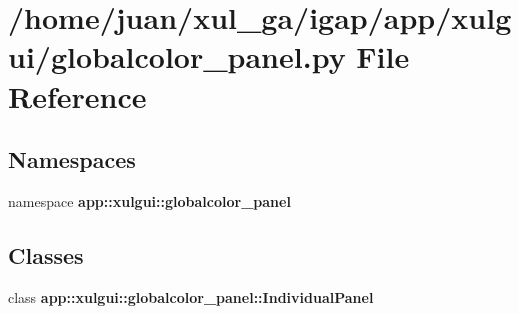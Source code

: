 \section{/home/juan/xul\_\-ga/igap/app/xulgui/globalcolor\_\-panel.py File Reference}
\label{globalcolor__panel_8py}
\subsection*{Namespaces}
\begin{CompactItemize}
\item 
namespace {\bf app::xulgui::globalcolor\_\-panel}
\end{CompactItemize}
\subsection*{Classes}
\begin{CompactItemize}
\item 
class {\bf app::xulgui::globalcolor\_\-panel::IndividualPanel}
\end{CompactItemize}
